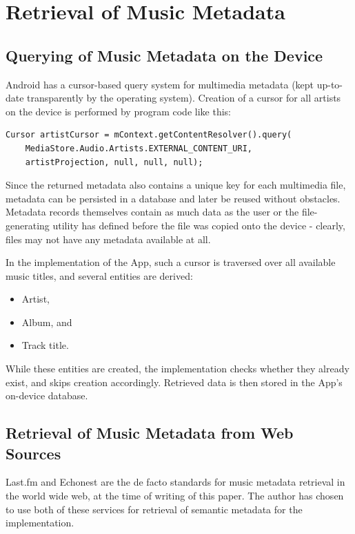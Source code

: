 \section{Retrieval of Music Metadata}

\subsection{Querying of Music Metadata on the Device}

Android has a cursor-based query system for multimedia metadata (kept up-to-date transparently by the operating system). Creation of a cursor for all artists on the device is performed by program code like this:

\begin{verbatim}
Cursor artistCursor = mContext.getContentResolver().query(
	MediaStore.Audio.Artists.EXTERNAL_CONTENT_URI,
    artistProjection, null, null, null);
\end{verbatim}

Since the returned metadata also contains a unique key for each multimedia file, metadata can be
persisted in a database and later be reused without obstacles.
Metadata records themselves contain as much data as the user or the file-generating utility has defined
before the file was copied onto the device - clearly, files may not have any metadata available at all.

In the implementation of the App, such a cursor is traversed over all available music titles, and several entities are derived:

\begin{itemize}
	\item Artist,
	\item Album, and
	\item Track title.
\end{itemize}

While these entities are created, the implementation checks whether they already exist, and skips creation accordingly. Retrieved data is then stored in the App's on-device database.

\subsection{Retrieval of Music Metadata from Web Sources}

Last.fm \cite{url:lastfm} and Echonest \cite{url:echonest} are the de facto standards for music metadata retrieval in the world wide web, 
at the time of writing of this paper. The author has chosen to use both of these services for retrieval 
of semantic metadata for the implementation. 

